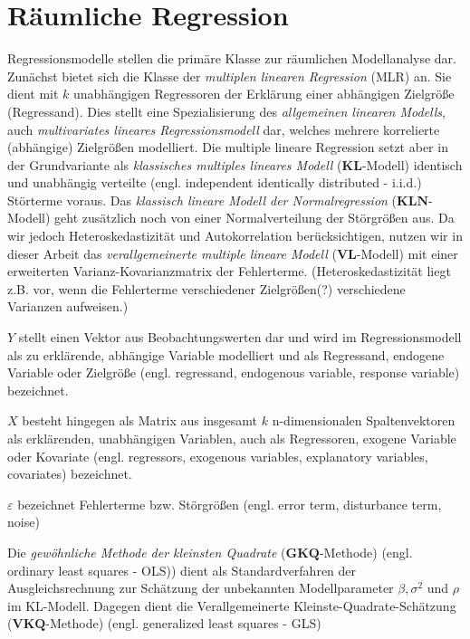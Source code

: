 \chapter{Räumliche Regression}

Regressionsmodelle stellen die primäre Klasse zur räumlichen Modellanalyse dar. Zunächst bietet sich die Klasse 
der \emph{multiplen linearen Regression} (MLR) an. Sie dient mit $k$ unabhängigen Regressoren der Erklärung einer 
abhängigen Zielgröße (Regressand). Dies stellt eine Spezialisierung des \emph{allgemeinen linearen Modells}, 
auch \emph{multivariates lineares Regressionsmodell} dar, welches mehrere korrelierte (abhängige) Zielgrößen modelliert. Die multiple lineare Regression setzt 
aber in der Grundvariante als \emph{klassisches multiples lineares Modell} ($\mathbf{KL}$-Modell) identisch und unabhängig 
verteilte (engl. independent identically distributed - i.i.d.) Störterme voraus. Das \emph{klassisch lineare Modell der Normalregression} ($\mathbf{KLN}$-Modell) geht zusätzlich noch von einer 
Normalverteilung der Störgrößen aus.
Da wir jedoch Heteroskedastizität und Autokorrelation berücksichtigen, 
nutzen wir in dieser Arbeit das \emph{verallgemeinerte multiple lineare Modell} ($\mathbf{VL}$-Modell) mit einer erweiterten Varianz-Kovarianzmatrix der Fehlerterme.
(Heteroskedastizität liegt z.B. vor, wenn die Fehlerterme verschiedener Zielgrößen(?) verschiedene Varianzen aufweisen.)

$Y$ stellt einen Vektor aus Beobachtungswerten dar und wird im Regressionsmodell als zu erklärende, abhängige Variable modelliert 
und als Regressand, endogene Variable oder Zielgröße (engl. regressand, endogenous variable, response variable) bezeichnet.

$X$ besteht hingegen als Matrix aus insgesamt $k$ n-dimensionalen Spaltenvektoren als erklärenden, unabhängigen Variablen, auch als Regressoren, exogene Variable oder Kovariate
(engl. regressors, exogenous variables, explanatory variables, covariates) bezeichnet.

$\varepsilon$ bezeichnet Fehlerterme bzw. Störgrößen (engl. error term, disturbance term, noise)

Die \emph{gewöhnliche Methode der kleinsten Quadrate} ($\mathbf{GKQ}$-Methode) (engl. ordinary least squares - OLS)) dient als Standardverfahren der Ausgleichsrechnung 
zur Schätzung der unbekannten Modellparameter $\beta, \sigma^{2}$ und $\rho$ im KL-Modell.
Dagegen dient die Verallgemeinerte Kleinste-Quadrate-Schätzung ($\mathbf{VKQ}$-Methode) (engl. generalized least squares - GLS) 

